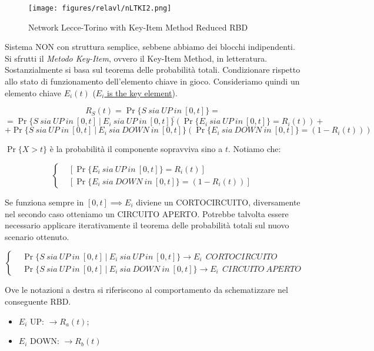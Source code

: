 \begin{center}
\begin{figure}[H]
\centering
\texttt{[image: figures/relavl/nLTKI2.png]}
\caption{Network Lecce-Torino with Key-Item Method Reduced RBD}
\end{figure}
\end{center}

Sistema NON con struttura semplice, sebbene abbiamo dei blocchi indipendenti. Si sfrutti il \textit{Metodo Key-Item}, ovvero il Key-Item Method, in letteratura. Sostanzialmente si basa sul teorema delle probabilità totali. Condizionare rispetto allo stato di funzionamento dell'elemento chiave in gioco. Consideriamo quindi un elemento chiave $E_i(t)$ (\underline{$E_i$ is the key element}). 

\[
	R_S(t) = \Pr\{\underline{\mathit{S}\ sia\ UP\ in\ [0,t]}\} =
\]
\[
	= \Pr\{\mathit{S}\ sia\ UP\ in\ [0,t]\ |\ E_i\ sia\ UP\ in\ [0,t]\}(\Pr\{E_i\ sia\ UP\ in\ [0,t]\}=R_i(t)) +
\]
\[
	+ \Pr\{\mathit{S}\ sia\ UP\ in\ [0,t]\ |\ E_i\ sia\ DOWN\ in\ [0,t]\}(\Pr\{E_i\ sia\ DOWN\ in\ [0,t]\}=(1-R_i(t)))
\]

$\Pr\{X > t\}$ è la probabilità il componente sopravviva sino a $t$. Notiamo che:

\[
	\left\{
	\begin{aligned}
	&[\Pr\{E_i\ sia\ UP\ in\ [0,t]\}=R_i(t)]\\
	&[\Pr\{E_i\ sia\ DOWN\ in\ [0,t]\}=(1-R_i(t))]
	\end{aligned}
	\right.
\]

Se funziona sempre in $[0,t] \implies E_i$ diviene un CORTOCIRCUITO, diversamente nel secondo caso otteniamo un CIRCUITO APERTO. Potrebbe talvolta essere necessario applicare iterativamente il teorema delle probabilità totali sul nuovo scenario ottenuto. 

\[
	\left\{
	\begin{aligned}
	&\Pr\{\mathit{S}\ sia\ UP\ in\ [0,t]\ |\ E_i\ sia\ UP\ in\ [0,t]\}\rightarrow E_i\ \  CORTOCIRCUITO\\
	&\Pr\{\mathit{S}\ sia\ UP\ in\ [0,t]\ |\ E_i\ sia\ DOWN\ in\ [0,t]\}\rightarrow E_i\ \ CIRCUITO\ APERTO
	\end{aligned}
	\right.
\]

Ove le notazioni a destra si riferiscono al comportamento da schematizzare nel conseguente RBD. 

\begin{itemize}

\item{$E_i$ UP}: $\rightarrow R_a(t)$;
\item{$E_i$ DOWN}: $\rightarrow R_b(t)$
\end{itemize}

